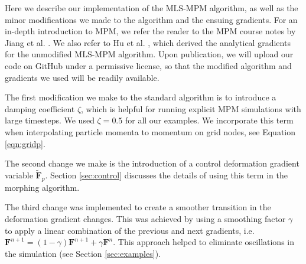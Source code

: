 \renewcommand{\theequation}{A\arabic{equation}} 
\setcounter{equation}{0}  %

Here we describe our implementation of the {MLS-MPM} algorithm, as well as the minor modifications we made to the algorithm and the ensuing gradients. %
For an in-depth introduction to {MPM}, we refer the reader to the {MPM} course notes by Jiang et al. \citep{jiang2016material}.
We also refer to Hu et al. \citep{2018-ChainQueen}, which derived the analytical gradients for the unmodified {MLS-MPM} algorithm.
Upon publication, we will upload our code on GitHub under a permissive license, so that the modified algorithm and gradients we used will be readily available.

The first modification we make to the standard algorithm is to introduce a damping coefficient $\zeta$, which is helpful for running explicit {MPM} simulations with large timesteps.
We used $\zeta = 0.5$ for all our examples.
We incorporate this term when interpolating particle momenta to momentum on grid nodes, see Equation \ref{eqn:gridp}.

The second change we make is the introduction of a control deformation gradient variable $\mathbf{\tilde{F}}_{p}$.
Section \ref{sec:control} discusses the details of using this term in the morphing algorithm.

\newcommand{\PK}[2]{\mathbf{P}_{#1} ^{#2} }

\newcommand{\F}[2]{\mathbf{F}_{#1} ^{#2} }


The third change was implemented to create a smoother transition in the deformation gradient changes. This was achieved by using a smoothing factor $\gamma$ to apply a linear combination of the previous and next gradients, i.e. $\textbf{F}^{n+1} = (1 - \gamma)\textbf{F}^{n+1} + \gamma\textbf{F}^{n}$. This approach helped to eliminate oscillations in the simulation (see Section \ref{sec:examples}).

